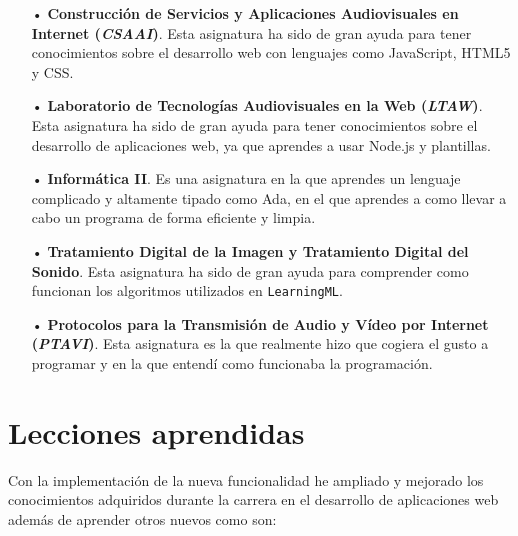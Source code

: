 \documentclass[a4paper, 12pt]{book}
\begin{document}
\begin{enumerate}
  \item[•] \textbf{Construcción de Servicios y Aplicaciones Audiovisuales en Internet (\emph{CSAAI})}. Esta asignatura ha sido de gran ayuda para tener conocimientos sobre el desarrollo web con lenguajes como JavaScript, HTML5 y CSS.
  
  \item[•] \textbf{Laboratorio de Tecnologías Audiovisuales en la Web (\emph{LTAW})}. Esta asignatura ha sido de gran ayuda para tener conocimientos sobre el desarrollo de aplicaciones web, ya que aprendes a usar Node.js y plantillas.
  
  \item[•] \textbf{Informática II}. Es una asignatura en la que aprendes un lenguaje complicado y altamente tipado como Ada, en el que aprendes a como llevar a cabo un programa de forma eficiente y limpia.
  
  \item[•] \textbf{Tratamiento Digital de la Imagen y Tratamiento Digital del Sonido}. Esta asignatura ha sido de gran ayuda para comprender como funcionan los algoritmos utilizados en \texttt{LearningML}.
  
  \item[•] \textbf{Protocolos para la Transmisión de Audio y Vídeo por Internet (\emph{PTAVI})}. Esta asignatura es la que realmente hizo que cogiera el gusto a programar y en la que entendí como funcionaba la programación.
  
\end{enumerate}


\section{Lecciones aprendidas}
\label{sec:lecciones_aprendidas}

Con la implementación de la nueva funcionalidad he ampliado y mejorado los conocimientos adquiridos durante la carrera en el desarrollo de aplicaciones web además de aprender otros nuevos como son:
\end{document}
